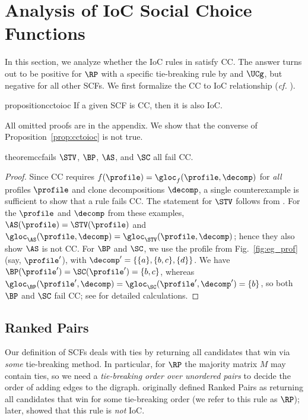 \section{Analysis of IoC Social Choice Functions}\label{sec:ioc_rules}
In this section, we analyze whether the IoC rules in  satisfy CC. The answer turns out to be positive for $\RP$ with a specific tie-breaking rule by \citet{Zavist89:Complete} and $\UCg$, but negative for all other SCFs. We first formalize the CC to IoC relationship (\emph{cf.} \citealt{Brandl16:Consistent}).
\begin{restatable}{proposition}{cctoioc}\label{prop:cctoioc}
    If a given SCF is CC, then it is also IoC.
\end{restatable}

All omitted proofs are in the appendix. We show that the converse of Proposition~\ref{prop:cctoioc} is not true.

\begin{restatable}{theorem}{ccfails}\label{thm:cc_fails}
    $\STV$, $\BP$, $\AS$, and $\SC$ all fail CC.
\end{restatable}
\begin{proof}
Since CC requires $f(\profile)=\gloc_f(\profile, \decomp)$ for \textit{all} profiles $\profile$ and clone decompositions $\decomp$, a single counterexample is sufficient to show that a rule fails CC. The statement for $\STV$ follows from . For the $\profile$ and $\decomp$ from these examples, $\AS(\profile)=\STV(\profile)$ and $\gloc_{\AS}(\profile, \decomp)=\gloc_{\STV}(\profile, \decomp)$; hence they also show $\AS$ is not CC. For $\BP$ and $\SC$, we use the profile from Fig.~\ref{fig:eg_prof} (say, $\profile'$), with $\decomp'=\{\{a\},\{b,c\}, \{d\}\}$. We have $\BP(\profile')=\SC(\profile')=\{b,c\}$, whereas $\gloc_{\BP}(\profile',\decomp)=\gloc_{\SC}(\profile',\decomp')=\{b\}$, so both $\BP$ and $\SC$ fail CC;
see  for detailed calculations.
\end{proof}

\subsection{Ranked Pairs}\label{subsec:rp}
Our definition of SCFs deals with ties by returning all candidates that win via \textit{some} tie-breaking method. In particular, for $\RP$ the majority matrix $M$ may contain ties, so we need a \textit{tie-breaking order over unordered pairs} to decide the order of adding edges to the digraph. \citet{Tideman87:Independence} originally defined Ranked Pairs as returning all candidates that win for some tie-breaking order (we refer to this rule as $\RP$); later, \citet{Zavist89:Complete} showed that this rule is \emph{not} IoC. 


